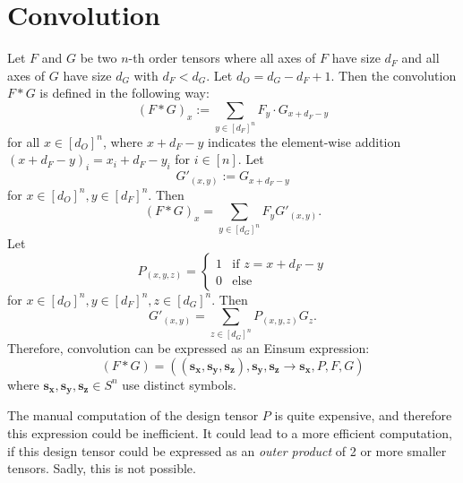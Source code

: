 \section{Convolution}

Let $F$ and $G$ be two $n$-th order tensors where all axes of $F$ have size $d_F$ and all axes of $G$ have size $d_G$ with $d_F < d_G$.
Let $d_O = d_G - d_F + 1$.
Then the convolution $F * G$ is defined in the following way:
$$(F * G)_x := \sum\limits_{y \in [d_F]^n} F_y \cdot G_{x + d_F - y}$$
for all $x \in [d_O]^n$, where $x + d_F - y$ indicates the element-wise addition $(x + d_F - y)_i = x_i + d_F - y_i$ for $i \in [n]$.
Let
$$G'_{(x, y)} := G_{x + d_F - y}$$
for $x \in [d_O]^n, y \in [d_F]^n$.
Then
$$(F * G)_x = \sum\limits_{y \in [d_G]^n} F_y G'_{(x, y)}.$$
Let
$$P_{(x, y, z)} = \begin{cases}
        1 & \text{if } z = x + d_F - y \\
        0 & \text{else}
    \end{cases}$$
for $x \in [d_O]^n, y \in [d_F]^n, z \in [d_G]^n$.
Then
$$G'_{(x, y)} = \sum\limits_{z \in [d_G]^n} P_{(x, y, z)} G_z.$$
Therefore, convolution can be expressed as an Einsum expression:
$$(F * G) = ((\bm{s_x},\bm{s_y},\bm{s_z}),\bm{s_y}, \bm{s_z}  \rightarrow \bm{s_x}, P, F, G)$$
where $\bm{s_x},\bm{s_y},\bm{s_z} \in S^n$ use distinct symbols.

The manual computation of the design tensor $P$ is quite expensive, and therefore this expression could be inefficient.
It could lead to a more efficient computation, if this design tensor could be expressed as an \textit{outer product} of 2 or more smaller tensors.
Sadly, this is not possible.

